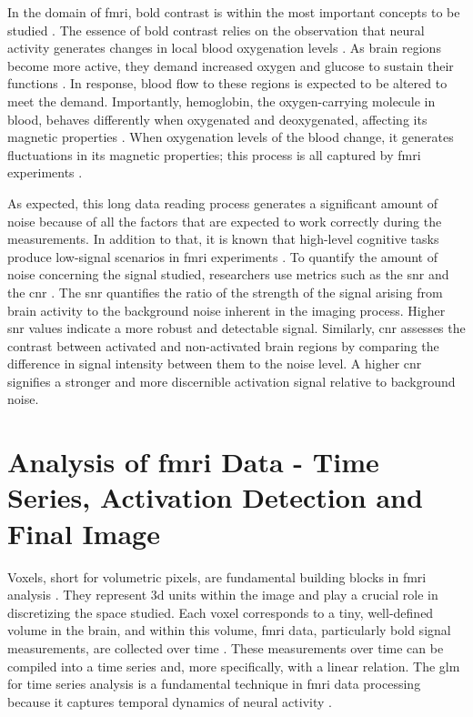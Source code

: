In the domain of \gls{fmri}, \gls{bold} contrast is within the most important concepts to be studied \cite{logothetis2004nature}. The essence of \gls{bold} contrast relies on the observation that neural activity generates changes in local blood oxygenation levels \cite{lindquist2008rapid}. As brain regions become more active, they demand increased oxygen and glucose to sustain their functions \cite{lindquist2008statistical}. In response, blood flow to these regions is expected to be altered to meet the demand. Importantly, hemoglobin, the oxygen-carrying molecule in blood, behaves differently when oxygenated and deoxygenated, affecting its magnetic properties \cite{uyuklu2009effect, pauling1936magnetic, bren2015discovery}. When oxygenation levels of the blood change, it generates fluctuations in its magnetic properties; this process is all captured by \gls{fmri} experiments \cite{buxton2012dynamic}.

As expected, this long data reading process generates a significant amount of noise because of all the factors that are expected to work correctly during the measurements. In addition to that, it is known that high-level cognitive tasks produce low-signal scenarios in \gls{fmri} experiments \cite{cui2011quantitative}. To quantify the amount of noise concerning the signal studied, researchers use metrics such as the \gls{snr} and the \gls{cnr} \cite{welvaert2013definition}. The \gls{snr} quantifies the ratio of the strength of the signal arising from brain activity to the background noise inherent in the imaging process. Higher \gls{snr} values indicate a more robust and detectable signal. Similarly, \gls{cnr} assesses the contrast between activated and non-activated brain regions by comparing the difference in signal intensity between them to the noise level. A higher \gls{cnr} signifies a stronger and more discernible activation signal relative to background noise.

\section{Analysis of \texorpdfstring{\gls{fmri}}{fMRI} Data - Time Series, Activation Detection and Final Image}

Voxels, short for volumetric pixels, are fundamental building blocks in \gls{fmri} analysis \cite{norman2006beyond}. They represent \gls{3d} units within the image and play a crucial role in discretizing the space studied. Each voxel corresponds to a tiny, well-defined volume in the brain, and within this volume, \gls{fmri} data, particularly \gls{bold} signal measurements, are collected over time \cite{li2009voxel}. These measurements over time can be compiled into a time series and, more specifically, with a linear relation. The \gls{glm} for time series analysis is a fundamental technique in \gls{fmri} data processing because it captures temporal dynamics of neural activity \cite{kiebel2007general, friston1994statistical}.

